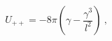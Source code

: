 \begin{equation}
U_{++}= -8\pi \left( \gamma - \frac{\gamma^3}{l^2} \right) \ ,
\label{upp}
\end{equation}

